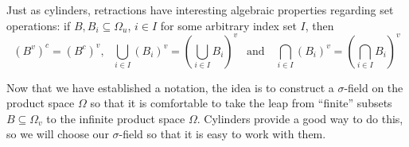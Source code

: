 \begin{remk}\label{remark:algebraic properties of retractions}
		Just as cylinders, retractions have interesting algebraic properties regarding set operations: if \(B, B_i\subseteq\Omega_u\), \(i\in I\) for some arbitrary index set \(I\), then
\[
				\left(B^v\right)^c=\left(B^c\right)^v,~~~\bigcup_{i\in I}\left(B_i\right)^v=\left(\bigcup_{i\in I}B_i\right)^v~~\text{ and }~~~\bigcap_{i\in I}\left(B_i\right)^v=\left(\bigcap_{i\in I}B_i\right)^v
\]
\end{remk}

Now that we have established a notation, the idea is to construct a \(\sigma\)-field on the product space \(\Omega\) so that it is comfortable to take the leap from ``finite'' subsets \(B\subseteq \Omega_v\) to the infinite product space \(\Omega\). Cylinders provide a good way to do this, so we will choose our \(\sigma\)-field so that it is easy to work with them.

